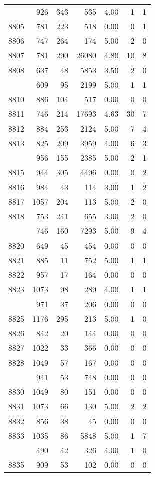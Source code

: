 \documentclass[
]{article}
\begin{document}
\begin{table}
\begin{tabular}[t]{lrrrrrr}
\addlinespace
8804 & 926 & 343 & 535 & 4.00 & 1 & 1\\
8805 & 781 & 223 & 518 & 0.00 & 0 & 1\\
8806 & 747 & 264 & 174 & 5.00 & 2 & 0\\
8807 & 781 & 290 & 26080 & 4.80 & 10 & 8\\
8808 & 637 & 48 & 5853 & 3.50 & 2 & 0\\
\addlinespace
8809 & 609 & 95 & 2199 & 5.00 & 1 & 1\\
8810 & 886 & 104 & 517 & 0.00 & 0 & 0\\
8811 & 746 & 214 & 17693 & 4.63 & 30 & 7\\
8812 & 884 & 253 & 2124 & 5.00 & 7 & 4\\
8813 & 825 & 209 & 3959 & 4.00 & 6 & 3\\
\addlinespace
8814 & 956 & 155 & 2385 & 5.00 & 2 & 1\\
8815 & 944 & 305 & 4496 & 0.00 & 0 & 2\\
8816 & 984 & 43 & 114 & 3.00 & 1 & 2\\
8817 & 1057 & 204 & 113 & 5.00 & 2 & 0\\
8818 & 753 & 241 & 655 & 3.00 & 2 & 0\\
\addlinespace
8819 & 746 & 160 & 7293 & 5.00 & 9 & 4\\
8820 & 649 & 45 & 454 & 0.00 & 0 & 0\\
8821 & 885 & 11 & 752 & 5.00 & 1 & 1\\
8822 & 957 & 17 & 164 & 0.00 & 0 & 0\\
8823 & 1073 & 98 & 289 & 4.00 & 1 & 1\\
\addlinespace
8824 & 971 & 37 & 206 & 0.00 & 0 & 0\\
8825 & 1176 & 295 & 213 & 5.00 & 1 & 0\\
8826 & 842 & 20 & 144 & 0.00 & 0 & 0\\
8827 & 1022 & 33 & 366 & 0.00 & 0 & 0\\
8828 & 1049 & 57 & 167 & 0.00 & 0 & 0\\
\addlinespace
8829 & 941 & 53 & 748 & 0.00 & 0 & 0\\
8830 & 1049 & 80 & 151 & 0.00 & 0 & 0\\
8831 & 1073 & 66 & 130 & 5.00 & 2 & 2\\
8832 & 856 & 38 & 45 & 0.00 & 0 & 0\\
8833 & 1035 & 86 & 5848 & 5.00 & 1 & 7\\
\addlinespace
8834 & 490 & 42 & 326 & 4.00 & 1 & 0\\
8835 & 909 & 53 & 102 & 0.00 & 0 & 0\\

\end{tabular}
\end{table}
\end{document}
